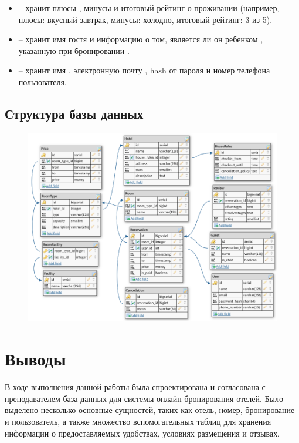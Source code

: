 \begin{itemize}
	\item {} -- хранит плюсы , минусы  и итоговый рейтинг  о проживании  (например, плюсы: вкусный завтрак, минусы: холодно, итоговый рейтинг: 3 из 5).
	
	\item {} -- хранит имя гостя  и информацию о том, является ли он ребенком , указанную при бронировании .
	
	\item {} -- хранит имя , электронную почту , hash от пароля  и номер телефона  пользователя.
\end{itemize}

\subsection{Структура базы данных}

\begin{figure}[H]
	\centering
	\includegraphics[width=\linewidth]{../../scheme}
\end{figure}

\section{Выводы}

В ходе выполнения данной работы была спроектирована и согласована с преподавателем база данных для системы онлайн-бронирования отелей. Было выделено несколько основные сущностей, таких как отель, номер, бронирование и пользователь, а также множество вспомогательных таблиц для хранения информации о предоставляемых удобствах, условиях размещения и отзывах.


